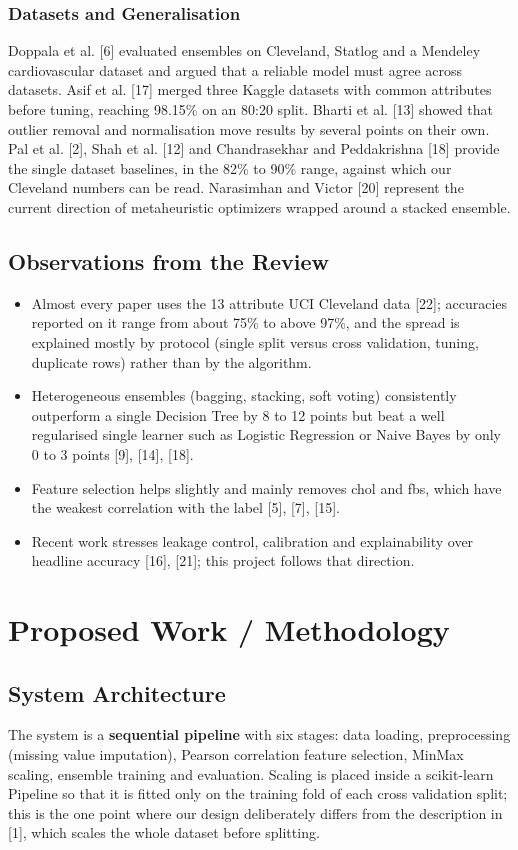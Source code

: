 \documentclass[12pt,a4paper,oneside]{report}
\begin{document}
\subsection{Datasets and Generalisation}
Doppala et al. [6] evaluated ensembles on Cleveland, Statlog and a Mendeley cardiovascular dataset and argued that a reliable model must agree across datasets. Asif et al. [17] merged three Kaggle datasets with common attributes before tuning, reaching 98.15\% on an 80:20 split. Bharti et al. [13] showed that outlier removal and normalisation move results by several points on their own. Pal et al. [2], Shah et al. [12] and Chandrasekhar and Peddakrishna [18] provide the single dataset baselines, in the 82\% to 90\% range, against which our Cleveland numbers can be read. Narasimhan and Victor [20] represent the current direction of metaheuristic optimizers wrapped around a stacked ensemble.

\section{Observations from the Review}
\begin{itemize}
  \item Almost every paper uses the 13 attribute UCI Cleveland data [22]; accuracies reported on it range from about 75\% to above 97\%, and the spread is explained mostly by protocol (single split versus cross validation, tuning, duplicate rows) rather than by the algorithm.
  \item Heterogeneous ensembles (bagging, stacking, soft voting) consistently outperform a single Decision Tree by 8 to 12 points but beat a well regularised single learner such as Logistic Regression or Naive Bayes by only 0 to 3 points [9], [14], [18].
  \item Feature selection helps slightly and mainly removes chol and fbs, which have the weakest correlation with the label [5], [7], [15].
  \item Recent work stresses leakage control, calibration and explainability over headline accuracy [16], [21]; this project follows that direction.
\end{itemize}

\chapter{Proposed Work / Methodology}
\section{System Architecture}
The system is a \textbf{sequential pipeline} with six stages: data loading, preprocessing (missing value imputation), Pearson correlation feature selection, MinMax scaling, ensemble training and evaluation. Scaling is placed inside a scikit-learn Pipeline so that it is fitted only on the training fold of each cross validation split; this is the one point where our design deliberately differs from the description in [1], which scales the whole dataset before splitting.
\end{document}
